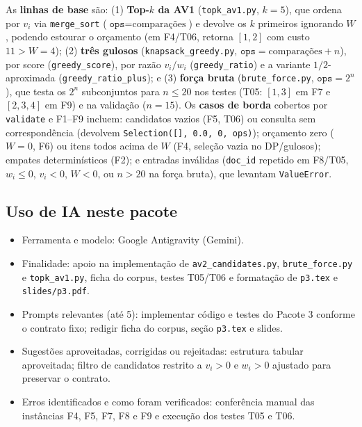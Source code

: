 As \textbf{linhas de base} são: (1) \textbf{Top-$k$ da AV1} (\texttt{topk\_av1.py}, $k=5$), que ordena por $v_i$ via \texttt{merge\_sort} ($\texttt{ops} = \text{comparações}$) e devolve os $k$ primeiros ignorando $W$, podendo estourar o orçamento (em F4/T06, retorna $[1, 2]$ com custo $11 > W = 4$); (2) \textbf{três gulosos} (\texttt{knapsack\_greedy.py}, $\texttt{ops} = \text{comparações} + n$), por score (\texttt{greedy\_score}), por razão $v_i/w_i$ (\texttt{greedy\_ratio}) e a variante $1/2$-aproximada (\texttt{greedy\_ratio\_plus}); e (3) \textbf{força bruta} (\texttt{brute\_force.py}, $\texttt{ops} = 2^n$), que testa os $2^n$ subconjuntos para $n \le 20$ nos testes (T05: $[1, 3]$ em F7 e $[2, 3, 4]$ em F9) e na validação ($n=15$). Os \textbf{casos de borda} cobertos por \texttt{validate} e F1--F9 incluem: candidatos vazios (F5, T06) ou consulta sem correspondência (devolvem \texttt{Selection([], 0.0, 0, ops)}); orçamento zero ($W=0$, F6) ou itens todos acima de $W$ (F4, seleção vazia no DP/gulosos); empates determinísticos (F2); e entradas inválidas (\texttt{doc\_id} repetido em F8/T05, $w_i \le 0$, $v_i < 0$, $W < 0$, ou $n > 20$ na força bruta), que levantam \texttt{ValueError}.

\subsection*{Uso de IA neste pacote}
\begin{itemize}
  \item Ferramenta e modelo: Google Antigravity (Gemini).
  \item Finalidade: apoio na implementação de \texttt{av2\_candidates.py}, \texttt{brute\_force.py} e \texttt{topk\_av1.py}, ficha do corpus, testes T05/T06 e formatação de \texttt{p3.tex} e \texttt{slides/p3.pdf}.
  \item Prompts relevantes (até 5): implementar código e testes do Pacote 3 conforme o contrato fixo; redigir ficha do corpus, seção \texttt{p3.tex} e slides.
  \item Sugestões aproveitadas, corrigidas ou rejeitadas: estrutura tabular aproveitada; filtro de candidatos restrito a $v_i > 0$ e $w_i > 0$ ajustado para preservar o contrato.
  \item Erros identificados e como foram verificados: conferência manual das instâncias F4, F5, F7, F8 e F9 e execução dos testes T05 e T06.
\end{itemize}

